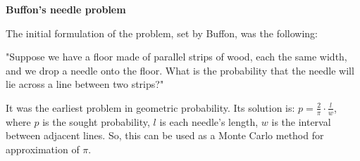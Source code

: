 \documentclass[12pt]{article}
\begin{document}
\begin{titlepage}
\begin{center}
	\LARGE\textbf{Buffon's needle problem}
\end{center}
\large

The initial formulation of the problem, set by Buffon, was the following:

"Suppose we have a floor made of parallel strips of wood, each the same width, and we drop a needle onto the floor. What is the probability that the needle will lie across a line between two strips?"

It was the earliest problem in geometric probability. Its solution is: $p=\frac{2}{\pi}\cdot\frac{l}{w}$, where $p$ is the sought probability, $l$ is each needle's length, $w$ is the interval between adjacent lines. So, this can be used as a Monte Carlo method for approximation of $\pi$.

\end{titlepage}
\end{document}
